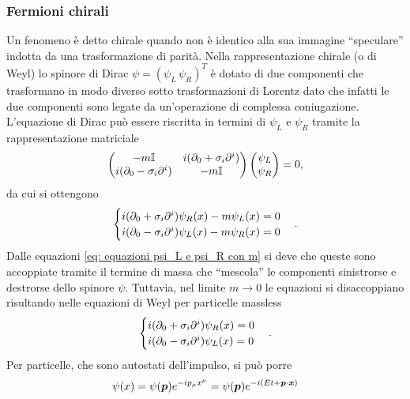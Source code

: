 \subsubsection{Fermioni chirali}
Un fenomeno è detto chirale quando non è identico alla sua immagine ``speculare'' indotta da una trasformazione di parità. Nella rappresentazione chirale (o di Weyl) lo spinore di Dirac $\psi = (\psi_L\,\psi_R)^T$ è dotato di due componenti che trasformano in modo diverso sotto trasformazioni di Lorentz dato che infatti le due componenti sono legate da un'operazione di complessa coniugazione. L'equazione di Dirac può essere riscritta in termini di $\psi_L$ e $\psi_R$ tramite la rappresentazione matriciale 
\begin{equation}
    \begin{pmatrix}
        -m\mathbb{I} & i(\partial_0 + \sigma_i\partial^i) \\
        i(\partial_0 -\sigma_i\partial^i) & -m\mathbb{I}
    \end{pmatrix}
    \begin{pmatrix}
        \psi_L \\
        \psi_R
    \end{pmatrix}
    = 0,
\end{equation}
da cui si ottengono
\begin{equation}
\label{eq: equazioni psi_L e psi_R con m}
    \begin{cases}
        i(\partial_0 + \sigma_i\partial^i)\psi_R(x) - m\psi_L(x) = 0 \\
        i(\partial_0 - \sigma_i\partial^i)\psi_L(x) - m\psi_R(x) = 0
    \end{cases}.
\end{equation}
Dalle equazioni \eqref{eq: equazioni psi_L e psi_R con m} si deve che queste sono accoppiate tramite il termine di massa che ``mescola'' le componenti sinistrorse e destrorse dello spinore $\psi$. Tuttavia, nel limite $m\to0$ le equazioni si disaccoppiano risultando nelle equazioni di Weyl per particelle massless
\begin{equation}
\label{eq: equazioni psi_L e psi_R senza m}
    \begin{cases}
        i(\partial_0 + \sigma_i\partial^i)\psi_R(x) = 0 \\
        i(\partial_0 - \sigma_i\partial^i)\psi_L(x) = 0
    \end{cases}.
\end{equation}
Per particelle, che sono autostati dell'impulso, si può porre
\begin{equation}
    \psi(x) = \psi(\bm{p})e^{-ip_\mu x^\mu} = \psi(\bm{p})e^{-i(Et + \bm{p}\cdot\bm{x})}
\end{equation}

